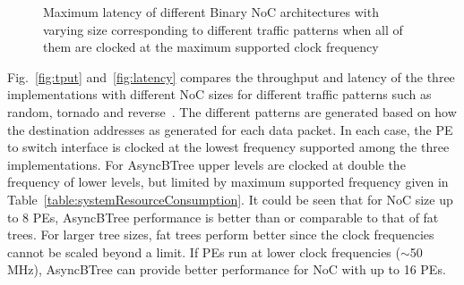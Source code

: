 \begin{figure}[t]
\centering     %
{}
\caption{Maximum latency of different Binary NoC architectures with varying size corresponding to different traffic patterns when all of them 
are clocked at the maximum supported clock frequency}
\label{fig:latmax}
\end{figure}

Fig.~\ref{fig:tput} and~\ref{fig:latency} compares the throughput and latency of the three implementations with different NoC sizes for different traffic patterns such as random, tornado and reverse~\cite{Bahn2008}.
The different patterns are generated based on how the destination addresses as generated for each data packet.
In each case, the PE to switch interface is clocked at the lowest frequency supported among the three implementations.
For AsyncBTree upper levels are clocked at double the frequency of lower levels, but limited by maximum supported frequency given in Table~\ref{table:systemResourceConsumption}.
It could be seen that for NoC size up to 8 PEs, AsyncBTree performance is better than or comparable to that of fat trees.
For larger tree sizes, fat trees perform better since the clock frequencies cannot be scaled beyond a limit.
If PEs run at lower clock frequencies ($\sim$50 MHz), AsyncBTree can provide better performance for NoC with up to 16 PEs. 

